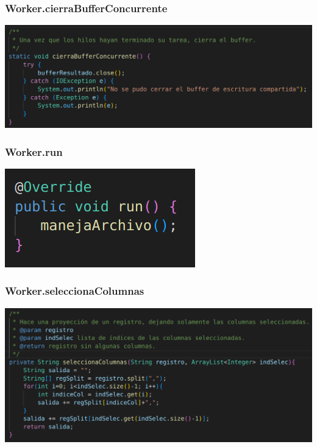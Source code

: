 \documentclass{beamer}
\begin{document}
\begin{frame}
\frametitle{Worker.cierraBufferConcurrente}
\includegraphics[width=\linewidth]{worker_cierrabufferconcurrente}
\end{frame}

\begin{frame}
\frametitle{Worker.run}
\includegraphics[width=\linewidth]{worker_run}
\end{frame}

\begin{frame}
\frametitle{Worker.seleccionaColumnas}
\includegraphics[width=\linewidth]{worker_seleccionacolumnas}
\end{frame}
\end{document}
